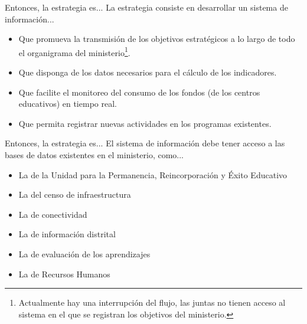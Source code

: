 \documentclass[xcolor=table, aspectratio=169]{beamer}
\begin{document}
\begin{frame}[t]{Entonces, la estrategia es...}
    La estrategia consiste en desarrollar un sistema de informaci\'on...
    
    \begin{itemize}
		\item Que promueva la transmisi\'on de los objetivos estrat\'egicos a lo largo de todo el organigrama del ministerio\footnote{Actualmente hay una interrupci\'on del flujo, las juntas no tienen acceso al sistema en el que se registran los objetivos del ministerio.}.
		\item Que disponga de los datos necesarios para el c\'alculo de los indicadores.
		\item Que facilite el monitoreo del consumo de los fondos (de los centros educativos) en tiempo real.
		\item Que permita registrar nuevas actividades en los programas existentes.
	\end{itemize}
\end{frame}

\begin{frame}[t]{Entonces, la estrategia es...}
    El sistema de informaci\'on debe tener acceso a las bases de datos existentes en el ministerio, como...
    
    \begin{itemize}
		\item La de la Unidad para la Permanencia, Reincorporaci\'on y \'Exito Educativo
		\item La del censo de infraestructura
		\item La de conectividad
		\item La de informaci\'on distrital
		\item La de evaluaci\'on de los aprendizajes
		\item La de Recursos Humanos
	\end{itemize}
\end{frame}
\end{document}
